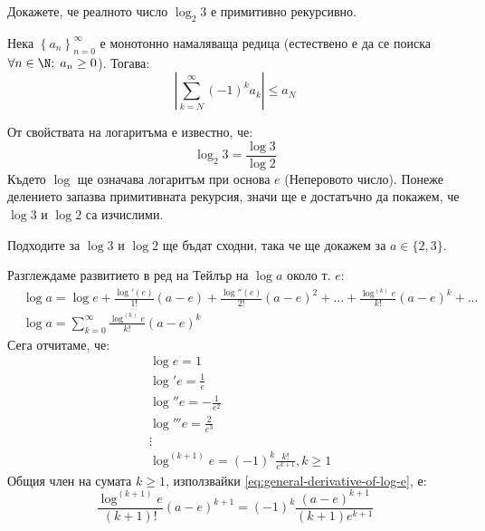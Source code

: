 \begin{problem} \label{exercise:log2-3-prim-rec}
    Докажете, че реалното число $\log_2 3$ е примитивно рекурсивно.
\end{problem}
\begin{hint}
    Нека $\left\{a_n\right\}_{n=0}^\infty$ е монотонно намаляваща редица (естествено е да се поиска $\forall n\in \N;\; a_n \geq 0$). Тогава:
    \begin{equation}\tag{Лайбниц}\label{eq:sum-Leibniz}
        \left\lvert \sum\limits_{k=N}^\infty (-1)^k a_k\right\rvert \leq a_N
    \end{equation}
\end{hint}
\begin{solution}
    От свойствата на логаритъма е известно, че:
    \begin{equation*}
        \log_2 3 = \frac{\log 3}{\log 2}
    \end{equation*}
    Където $\log$ ще означава логаритъм при основа $e$ (Неперовото число). Понеже делението запазва примитивната рекурсия, значи ще е достатъчно да покажем, че $\log 3$ и $\log 2$ са изчислими.

    Подходите за $\log 3$ и $\log 2$ ще бъдат сходни, така че ще докажем за $a \in \{2, 3\}$.

    Разглеждаме развитието в ред на Тейлър на $\log a$ около т. $e$:
    \begin{equation} \label{eq:taylor-exp-log-1}
        \begin{split}
            & \log a = \log e + \frac{\log'(e)}{1!} (a - e) + \frac{\log''(e)}{2!} (a - e)^2 + \dots + \frac{\log^{(k)}e}{k!}(a-e)^k + \dots \\
            & \log a = \sum_{k=0}^\infty \frac{\log^{(k)}e}{k!}(a-e)^k
        \end{split}
    \end{equation}
    Сега отчитаме, че:
    \begin{equation}\label{eq:general-derivative-of-log-e}
        \begin{split}
            & \log e = 1 \\
            & \log' e = \frac{1}{e} \\
            & \log'' e = -\frac{1}{e^2} \\
            & \log''' e = \frac{2}{e^3} \\
            & \vdots \\
            & \log^{(k+1)} e = (-1)^{k} \frac{k!}{e^{k+1}}, k \geq 1
        \end{split}
    \end{equation}
    Общия член на сумата $k\geq 1$, използвайки \eqref{eq:general-derivative-of-log-e}, е:
    \begin{equation}
        \frac{\log^{(k+1)} e}{(k+1)!}(a-e)^{k+1} =  (-1)^{k} \frac{(a-e)^{k+1}}{(k+1)e^{k+1}}
    \end{equation}
    

\end{solution}

